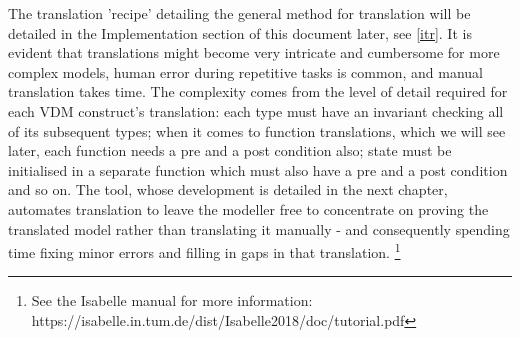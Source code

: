 The translation 'recipe' detailing the general method for translation will be detailed in the Implementation section of this document later, see \ref{itr}. It is evident that translations might become very intricate and cumbersome for more complex models, human error during repetitive tasks is common, and manual translation takes time. The complexity comes from the level of detail required for each VDM construct's translation: each type must have an invariant checking all of its subsequent types; when it comes to function translations, which we will see later, each function needs a pre and a post condition also; state must be initialised in a separate function which must also have a pre and a post condition and so on. The tool, whose development is detailed in the next chapter, automates translation to leave the modeller free to concentrate on proving the translated model rather than translating it manually - and consequently spending time fixing minor errors and filling in gaps in that translation. \footnote{See the Isabelle manual for more information: https://isabelle.in.tum.de/dist/Isabelle2018/doc/tutorial.pdf}